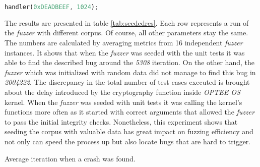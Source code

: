 \begin{minipage}{\linewidth}
    \begin{lstlisting}[language=rust,caption={Unit test for the \textit{handler} function.},label={lst:uthandler}]
handler(0xDEADBEEF, 1024);
    \end{lstlisting}
\end{minipage}

The results are presented in table \ref{tab:seededres}. Each row represents a run of the \textit{fuzzer} with different corpus. Of course, all other parameters stay the same. The numbers are calculated by averaging metrics from 16 independent \textit{fuzzer} instances. It shows that when the \textit{fuzzer} was seeded with the unit tests it was able to find the described bug around the \textit{5308} iteration. On the other hand, the \textit{fuzzer} which was initialized with random data did not manage to find this bug in \textit{2004222}. The discrepancy in the total number of test cases executed is brought about the delay introduced by the cryptography function inside \textit{OPTEE OS} kernel. When the \textit{fuzzer} was seeded with unit tests it was calling the kernel's functions more often as it started with correct arguments that allowed the \textit{fuzzer} to pass the initial integrity checks. Nonetheless, this experiment shows that seeding the corpus with valuable data has great impact on fuzzing efficiency and not only can speed the process up but also locate bugs that are hard to trigger.

\begin{table}
    \centering
    
    \caption{Average iteration when a crash was found.}
    \label{tab:seededres}
\end{table}